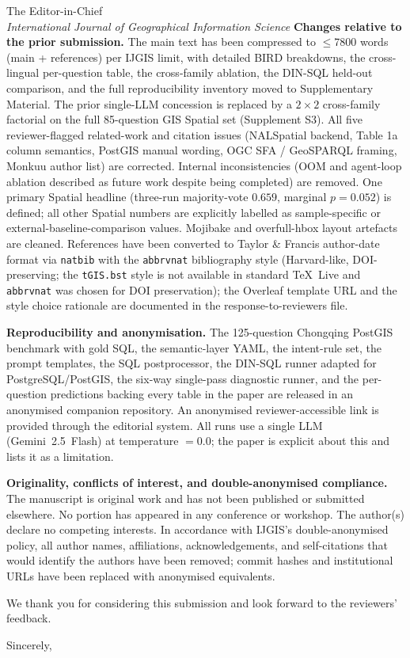 \documentclass[11pt]{letter}
\begin{document}
\begin{letter}{The Editor-in-Chief \\ \emph{International Journal of Geographical Information Science}}
\medskip
\noindent\textbf{Changes relative to the prior submission.} The main text has been compressed to $\leq$7800 words (main + references) per IJGIS limit, with detailed BIRD breakdowns, the cross-lingual per-question table, the cross-family ablation, the DIN-SQL held-out comparison, and the full reproducibility inventory moved to Supplementary Material. The prior single-LLM concession is replaced by a $2{\times}2$ cross-family factorial on the full 85-question GIS Spatial set (Supplement S3). All five reviewer-flagged related-work and citation issues (NALSpatial backend, Table 1a column semantics, PostGIS manual wording, OGC SFA / GeoSPARQL framing, Monkuu author list) are corrected. Internal inconsistencies (OOM and agent-loop ablation described as future work despite being completed) are removed. One primary Spatial headline (three-run majority-vote $0.659$, marginal $p=0.052$) is defined; all other Spatial numbers are explicitly labelled as sample-specific or external-baseline-comparison values. Mojibake and overfull-hbox layout artefacts are cleaned. References have been converted to Taylor \& Francis author-date format via \texttt{natbib} with the \texttt{abbrvnat} bibliography style (Harvard-like, DOI-preserving; the \texttt{tGIS.bst} style is not available in standard \TeX\ Live and \texttt{abbrvnat} was chosen for DOI preservation); the Overleaf template URL and the style choice rationale are documented in the response-to-reviewers file.

\medskip
\noindent\textbf{Reproducibility and anonymisation.} The 125-question Chongqing PostGIS benchmark with gold SQL, the semantic-layer YAML, the intent-rule set, the prompt templates, the SQL postprocessor, the DIN-SQL runner adapted for PostgreSQL/PostGIS, the six-way single-pass diagnostic runner, and the per-question predictions backing every table in the paper are released in an anonymised companion repository. An anonymised reviewer-accessible link is provided through the editorial system. All runs use a single LLM (Gemini~2.5~Flash) at temperature $=0.0$; the paper is explicit about this and lists it as a limitation.

\medskip
\noindent\textbf{Originality, conflicts of interest, and double-anonymised compliance.} The manuscript is original work and has not been published or submitted elsewhere. No portion has appeared in any conference or workshop. The author(s) declare no competing interests. In accordance with IJGIS's double-anonymised policy, all author names, affiliations, acknowledgements, and self-citations that would identify the authors have been removed; commit hashes and institutional URLs have been replaced with anonymised equivalents.

We thank you for considering this submission and look forward to the reviewers' feedback.

\closing{Sincerely,}

\end{letter}
\end{document}
